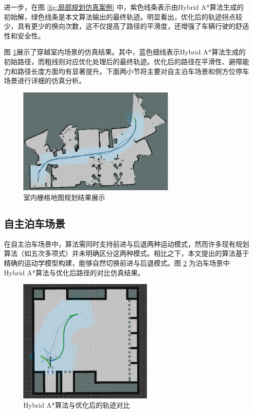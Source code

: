 \documentclass[master,academic]{ysuthesis} %
\begin{document}
	进一步，在图 \ref{fig:局部规划仿真案例} 中，紫色线条表示由Hybrid A*算法生成的初始解，绿色线条是本文算法输出的最终轨迹。明显看出，优化后的轨迹拐点较少，具有更少的换向次数，这不仅提高了路径的平滑度，还增强了车辆行驶的舒适性和安全性。

	图 \ref{fig:nmpcyuewa1}展示了穿越室内场景的仿真结果。其中，蓝色细线表示Hybrid A*算法生成的初始路径，而粗线则对应优化处理后的最终轨迹。优化后的路径在平滑性、避障能力和路径长度方面均有显著提升。下面两小节将主要对自主泊车场景和侧方位停车场景进行详细的仿真分析。

	\begin{figure}[H]
		\centering
		\includegraphics[width=0.7\textwidth]{nmpcyuewa1.png}
		\caption{室内栅格地图规划结果展示}
		\label{fig:nmpcyuewa1}
	\end{figure}

		\subsection{自主泊车场景}
		在自主泊车场景中，算法需同时支持前进与后退两种运动模式，然而许多现有规划算法（如五次多项式）并未明确区分这两种模式。相比之下，本文提出的算法基于精确的运动学模型构建，能够自然切换前进与后退模式。图 \ref{fig:boche} 为泊车场景中Hybrid A*算法与优化后路径的对比仿真结果。
		\begin{figure}[H]
			\centering
			\includegraphics[width=0.6\textwidth]{boche.png}
			\caption{Hybrid A*算法与优化后的轨迹对比}
			\label{fig:boche}
		\end{figure}
		
\end{document}
